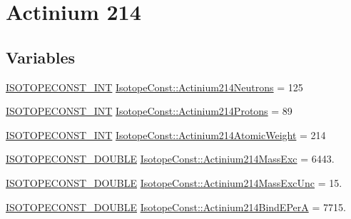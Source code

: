 \hypertarget{group___isotope_const-_actinium-_ac214}{}\section{Actinium 214}
\label{group___isotope_const-_actinium-_ac214}
\subsection*{Variables}
\begin{DoxyCompactItemize}
\item 
\mbox{\hyperlink{group___isotope_const-_macros_ga5f18360b3e99483a35c32d789e62621c}{I\+S\+O\+T\+O\+P\+E\+C\+O\+N\+S\+T\+\_\+\+I\+NT}} \mbox{\hyperlink{group___isotope_const-_actinium-_ac214_ga1c36abc45f47bc6a728468be1a87d851}{Isotope\+Const\+::\+Actinium214\+Neutrons}} = 125
\item 
\mbox{\hyperlink{group___isotope_const-_macros_ga5f18360b3e99483a35c32d789e62621c}{I\+S\+O\+T\+O\+P\+E\+C\+O\+N\+S\+T\+\_\+\+I\+NT}} \mbox{\hyperlink{group___isotope_const-_actinium-_ac214_ga1830e767f3726552055d0bde457e28ad}{Isotope\+Const\+::\+Actinium214\+Protons}} = 89
\item 
\mbox{\hyperlink{group___isotope_const-_macros_ga5f18360b3e99483a35c32d789e62621c}{I\+S\+O\+T\+O\+P\+E\+C\+O\+N\+S\+T\+\_\+\+I\+NT}} \mbox{\hyperlink{group___isotope_const-_actinium-_ac214_gaf3fc9eecaf5618e41650ac9878c97854}{Isotope\+Const\+::\+Actinium214\+Atomic\+Weight}} = 214
\item 
\mbox{\hyperlink{group___isotope_const-_macros_ga8f45a7272ce02c0b4c65c44636ed719a}{I\+S\+O\+T\+O\+P\+E\+C\+O\+N\+S\+T\+\_\+\+D\+O\+U\+B\+LE}} \mbox{\hyperlink{group___isotope_const-_actinium-_ac214_ga7008818a4719ee68aa6b4be69db3242a}{Isotope\+Const\+::\+Actinium214\+Mass\+Exc}} = 6443.
\item 
\mbox{\hyperlink{group___isotope_const-_macros_ga8f45a7272ce02c0b4c65c44636ed719a}{I\+S\+O\+T\+O\+P\+E\+C\+O\+N\+S\+T\+\_\+\+D\+O\+U\+B\+LE}} \mbox{\hyperlink{group___isotope_const-_actinium-_ac214_ga0589bc152b289c4b1e2e54eca0aa4580}{Isotope\+Const\+::\+Actinium214\+Mass\+Exc\+Unc}} = 15.
\item 
\mbox{\hyperlink{group___isotope_const-_macros_ga8f45a7272ce02c0b4c65c44636ed719a}{I\+S\+O\+T\+O\+P\+E\+C\+O\+N\+S\+T\+\_\+\+D\+O\+U\+B\+LE}} \mbox{\hyperlink{group___isotope_const-_actinium-_ac214_ga9649180691ce6a910f97621222013324}{Isotope\+Const\+::\+Actinium214\+Bind\+E\+PerA}} = 7715.
\item 

\end{DoxyCompactItemize}
